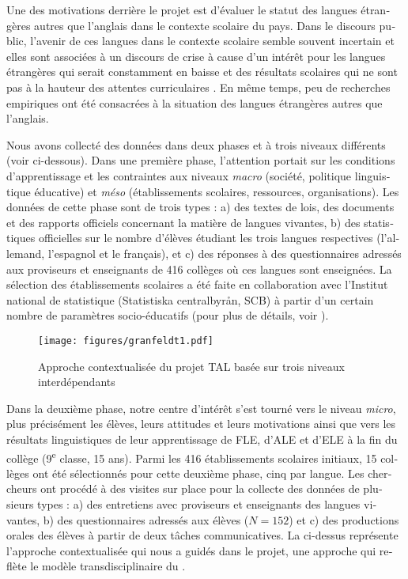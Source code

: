 \documentclass[french, output=paper]{langscibook}
\begin{document}
\begin{otherlanguage}{french}
Une des motivations derrière le projet est d’évaluer le statut des langues étrangères autres que l’anglais dans le contexte scolaire du pays. Dans le discours public, l’avenir de ces langues dans le contexte scolaire semble souvent incertain et elles sont associées à un discours de crise à cause d’un intérêt pour les langues étrangères qui serait constamment en baisse \citep{GranfeldtEtAl2019} et des résultats scolaires qui ne sont pas à la hauteur des attentes curriculaires \citep{CommissionEuropéenne2012}. En même temps, peu de recherches empiriques ont été consacrées à la situation des langues étrangères autres que l’anglais. 

Nous avons collecté des données dans deux phases et à trois niveaux différents (voir  ci-dessous). Dans une première phase, l’attention portait sur les conditions d’apprentissage et les contraintes aux niveaux \textit{macro} (société, politique linguistique éducative) et \textit{méso} (établissements scolaires, ressources, organisations). Les données de cette phase sont de trois types : a) des textes de lois, des documents et des rapports officiels concernant la matière de langues vivantes, b) des statistiques officielles sur le nombre d’élèves étudiant les trois langues respectives (l’allemand, l’espagnol et le français), et c) des réponses à des questionnaires adressés aux proviseurs et enseignants de 416 collèges où ces langues sont enseignées. La sélection des établissements scolaires a été faite en collaboration avec l’Institut national de statistique (Statistiska centralbyrån, SCB) à partir d’un certain nombre de paramètres socio-éducatifs (pour plus de détails, voir \citealt{GranfeldtEtAl2019}). 


\begin{figure}
\texttt{[image: figures/granfeldt1.pdf]}
\caption{Approche contextualisée du projet TAL basée sur trois niveaux interdépendants\label{fig:granfeldt:1}}
\end{figure}

Dans la deuxième phase, notre centre d’intérêt s’est tourné vers le niveau \textit{micro}, plus précisément les élèves, leurs attitudes et leurs motivations ainsi que vers les résultats linguistiques de leur apprentissage de FLE, d’ALE et d’ELE à la fin du collège (9\textsuperscript{e} classe, 15 ans). Parmi les 416 établissements scolaires initiaux, 15 collèges ont été sélectionnés pour cette deuxième phase, cinq par langue. Les chercheurs ont procédé à des visites sur place pour la collecte des données de plusieurs types : a) des entretiens avec proviseurs et enseignants des langues vivantes, b) des questionnaires adressés aux élèves ($N=152$) et c) des productions orales des élèves à partir de deux tâches communicatives. La  ci-dessus représente l’approche contextualisée qui nous a guidés dans le projet, une approche qui reflète le modèle transdisciplinaire du \citet{TheDouglasFirgroup2016}. 


\end{otherlanguage}
\end{document}
